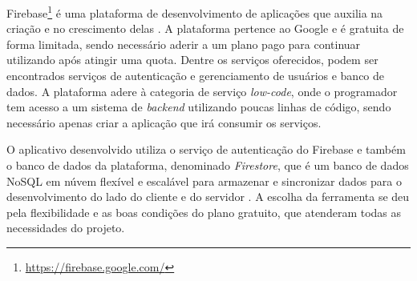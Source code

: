 Firebase\footnote{\url{https://firebase.google.com/}} é uma plataforma de desenvolvimento de aplicações que auxilia na criação e no crescimento delas \cite{firebase}. A plataforma pertence ao Google e é gratuita de forma limitada, sendo necessário aderir a um plano pago para continuar utilizando após atingir uma quota. Dentre os serviços oferecidos, podem ser encontrados serviços de autenticação e gerenciamento de usuários e banco de dados. A plataforma adere à categoria de serviço \textit{low-code}, onde o programador tem acesso a um sistema de \textit{backend} utilizando poucas linhas de código, sendo necessário apenas criar a aplicação que irá consumir os serviços.

O aplicativo desenvolvido utiliza o serviço de autenticação do Firebase e também o banco de dados da plataforma, denominado \textit{Firestore}, que é um banco de dados NoSQL em núvem flexível e escalável para armazenar e sincronizar dados para o desenvolvimento do lado do cliente e do servidor \cite{firestore}. A escolha da ferramenta se deu pela flexibilidade e as boas condições do plano gratuito, que atenderam todas as necessidades do projeto.
